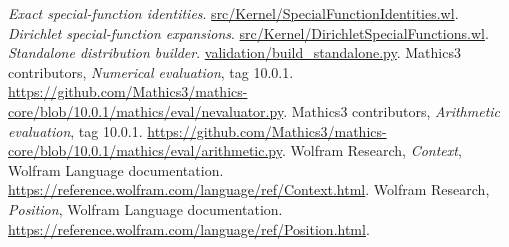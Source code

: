 \documentclass[11pt,letterpaper]{article}
\newcommand{\src}[2]{\href{https://github.com/VladimirReshetnikov/Asymptotic/blob/8cee870994f506b501bae3ea6bd4a3a7edb895c1/#1}{#2}}
\begin{document}
\begin{thebibliography}{99}
 \emph{Exact special-function identities}. \src{src/Kernel/SpecialFunctionIdentities.wl}{src/Kernel/SpecialFunctionIdentities.wl}.
 \emph{Dirichlet special-function expansions}. \src{src/Kernel/DirichletSpecialFunctions.wl}{src/Kernel/DirichletSpecialFunctions.wl}.
 \emph{Standalone distribution builder}. \src{validation/build_standalone.py}{validation/build\_standalone.py}.
 Mathics3 contributors, \emph{Numerical evaluation}, tag 10.0.1. \url{https://github.com/Mathics3/mathics-core/blob/10.0.1/mathics/eval/nevaluator.py}.
 Mathics3 contributors, \emph{Arithmetic evaluation}, tag 10.0.1. \url{https://github.com/Mathics3/mathics-core/blob/10.0.1/mathics/eval/arithmetic.py}.
 Wolfram Research, \emph{Context}, Wolfram Language documentation. \url{https://reference.wolfram.com/language/ref/Context.html}.
 Wolfram Research, \emph{Position}, Wolfram Language documentation. \url{https://reference.wolfram.com/language/ref/Position.html}.
\end{thebibliography}
\end{document}
